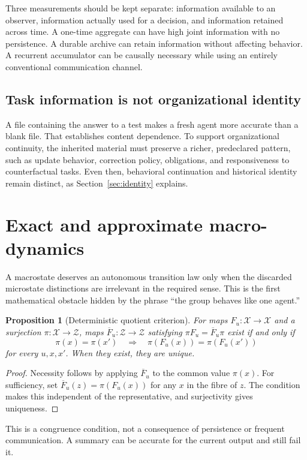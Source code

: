 \documentclass[11pt,letterpaper]{article}
\theoremstyle{plain}
\newtheorem{proposition}{Proposition}[section]
\theoremstyle{definition}
\theoremstyle{remark}
\newcommand{\X}{\mathcal X}
\newcommand{\Z}{\mathcal Z}
\begin{document}
Three measurements should be kept separate: information available to an observer, information actually used for a decision, and information retained across time. A one-time aggregate can have high joint information with no persistence. A durable archive can retain information without affecting behavior. A recurrent accumulator can be causally necessary while using an entirely conventional communication channel.

\subsection{Task information is not organizational identity}
A file containing the answer to a test makes a fresh agent more accurate than a blank file. That establishes content dependence. To support organizational continuity, the inherited material must preserve a richer, predeclared pattern, such as update behavior, correction policy, obligations, and responsiveness to counterfactual tasks. Even then, behavioral continuation and historical identity remain distinct, as Section~\ref{sec:identity} explains.

\section{Exact and approximate macro-dynamics}\label{sec:closure}
A macrostate deserves an autonomous transition law only when the discarded microstate distinctions are irrelevant in the required sense. This is the first mathematical obstacle hidden by the phrase ``the group behaves like one agent.''

\begin{proposition}[Deterministic quotient criterion]\label{prop:det}
For maps $F_u:\X\to\X$ and a surjection $\pi:\X\to\Z$, maps $\overline F_u:\Z\to\Z$ satisfying $\pi F_u=\overline F_u\pi$ exist if and only if
\[
\pi(x)=\pi(x')\quad\Longrightarrow\quad
\pi(F_u(x))=\pi(F_u(x'))
\]
for every $u,x,x'$. When they exist, they are unique.
\end{proposition}
\begin{proof}
Necessity follows by applying $\overline F_u$ to the common value $\pi(x)$. For sufficiency, set $\overline F_u(z)=\pi(F_u(x))$ for any $x$ in the fibre of $z$. The condition makes this independent of the representative, and surjectivity gives uniqueness.
\end{proof}

This is a congruence condition, not a consequence of persistence or frequent communication. A summary can be accurate for the current output and still fail it.
\end{document}
